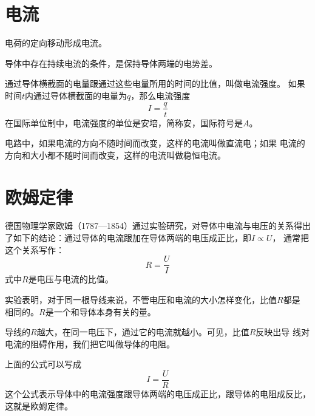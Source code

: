 \section{电流}
\begin{definition}
    电荷的定向移动形成电流。
\end{definition}

\begin{theorem}
    导体中存在持续电流的条件，是保持导体两端的电势差。
\end{theorem}

\begin{definition}
    通过导体横截面的电量跟通过这些电量所用的时间的比值，叫做电流强度。
    如果时间$t$内通过导体横截面的电量为$q$，那么电流强度
    \begin{equation}
        I=\frac{q}{t}
    \end{equation}
    在国际单位制中，电流强度的单位是安培，简称安，国际符号是$A$。
\end{definition}

\begin{definition}
    电路中，如果电流的方向不随时间而改变，这样的电流叫做直流电；如果
    电流的方向和大小都不随时间而改变，这样的电流叫做稳恒电流。
\end{definition}

\section{欧姆定律}
\begin{theorem}
    德国物理学家欧姆（1787—1854）通过实验研究，对导体中电流与电压的关系得出
    了如下的结论：通过导体的电流跟加在导体两端的电压成正比，即$I\propto U$，
    通常把这个关系写作：
    \begin{equation}
        R=\frac{U}{I}
    \end{equation}
    式中$R$是电压与电流的比值。
\end{theorem}

实验表明，对于同一根导线来说，不管电压和电流的大小怎样变化，比值$R$都是
相同的。$R$是一个和导体本身有关的量。

\begin{definition}
    导线的$ R $越大，在同一电压下，通过它的电流就越小。可见，比值$ R $反映出导
    线对电流的阻碍作用，我们把它叫做导体的电阻。
\end{definition}

上面的公式可以写成 
\begin{equation}
    I=\frac{U}{R}
\end{equation}
这个公式表示导体中的电流强度跟导体两端的电压成正比，跟导体的电阻成反比，
这就是欧姆定律。

